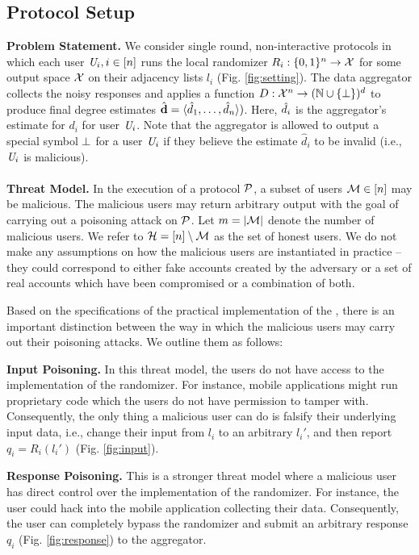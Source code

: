 \subsection{Protocol Setup}
\noindent\textbf{Problem Statement.}  
We consider single round,  non-interactive protocols in which each user $\textit{U}_i, i \in [n]$ runs the local randomizer
$R_i : \{0,1\}^n \rightarrow \mathcal{X}$ for some output space $\mathcal{X}$ on their adjacency lists $l_i$ (Fig. \ref{fig:setting}). The data aggregator collects the noisy responses and applies a function 
$D : \mathcal{X}^n \rightarrow (\mathbb{N} \cup \{\perp\})^d$ to produce final degree estimates  $\hat{\textbf{d}}=\langle \hat{d}_1, \ldots, \hat{d}_n\rangle)$. Here, $\hat{d}_i$ is the aggregator's estimate for $d_i$ for user $\textit{U}_i$. Note that the aggregator is allowed to output a special symbol $\perp$ for a user $\textit{U}_i$ if they believe the estimate $\hat{d}_i$ to be invalid (i.e., $\textit{U}_i$ is malicious).
  \vspace{-0.2cm}  \\\\
\noindent\textbf{Threat Model.}
In the execution of a protocol $\mathcal{P}$, a subset of users $\mathcal{M} \in [n]$ may be malicious. The malicious users may return arbitrary output with the goal of carrying out a poisoning attack on  $\mathcal{P}$. Let
$m=|\mathcal{M}|$ denote the number of malicious users. We refer to 
$\mathcal{H} = [n] \setminus \mathcal{M}$ as the set of honest users.
We do not make any assumptions on how the malicious users are instantiated in practice -- they could correspond to either fake accounts created by the adversary or a set of real accounts which have been compromised or a combination of both. 

Based on the specifications of the practical implementation of the \ldp, there is an important distinction between the way in which the malicious users may carry out their poisoning attacks. We outline them as follows:

\squishlist
    \item \textbf{Input Poisoning.} In this threat model, the users do not have access to the implementation of the \ldp{} randomizer. For instance, mobile applications might run proprietary code which the users do not have permission to tamper with. Consequently, the only thing a malicious user can do is falsify their underlying input data, i.e.,  change their input from $l_i$ to an arbitrary $l_i'$, and then report $q_i = R_i(l_i')$ (Fig. \ref{fig:input}).
    
    \item \textbf{Response Poisoning.} This is a stronger threat model where a malicious user has direct control over the implementation of the \ldp{} randomizer. For instance, the user could hack into the mobile application collecting their data. Consequently, the user can completely bypass the randomizer and submit an arbitrary response $q_{i}$ (Fig. \ref{fig:response}) to the aggregator.
\squishend

